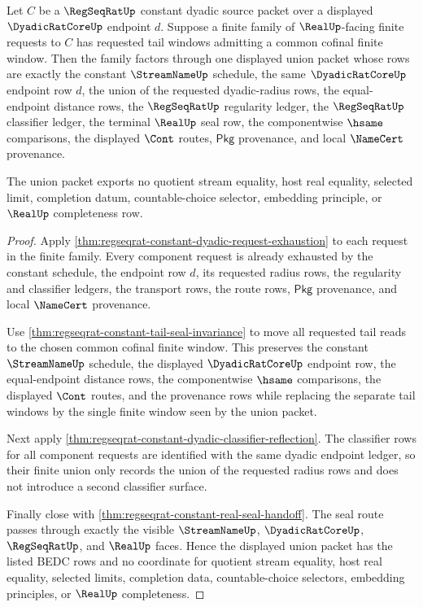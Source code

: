 \begin{theorem}
\label{thm:regseqrat-constant-dyadic-finite-request-union-seal}
Let $C$ be a $\RegSeqRatUp$ constant dyadic source packet over a displayed
$\DyadicRatCoreUp$ endpoint $d$. Suppose a finite family of
$\RealUp$-facing finite requests to $C$ has requested tail windows admitting a
common cofinal finite window. Then the family factors through one displayed
union packet whose rows are exactly the constant $\StreamNameUp$ schedule, the
same $\DyadicRatCoreUp$ endpoint row $d$, the union of the requested
dyadic-radius rows, the equal-endpoint distance rows, the
$\RegSeqRatUp$ regularity ledger, the $\RegSeqRatUp$ classifier ledger, the
terminal $\RealUp$ seal row, the componentwise $\hsame$ comparisons, the
displayed $\Cont$ routes, $\mathsf{Pkg}$ provenance, and local $\NameCert$
provenance.

The union packet exports no quotient stream equality, host real equality,
selected limit, completion datum, countable-choice selector, embedding
principle, or $\RealUp$ completeness row.
\end{theorem}
\begin{proof}
Apply \autoref{thm:regseqrat-constant-dyadic-request-exhaustion} to each
request in the finite family. Every component request is already exhausted by
the constant schedule, the endpoint row $d$, its requested radius rows, the
regularity and classifier ledgers, the transport rows, the route rows,
$\mathsf{Pkg}$ provenance, and local $\NameCert$ provenance.

Use \autoref{thm:regseqrat-constant-tail-seal-invariance} to move all
requested tail reads to the chosen common cofinal finite window. This preserves
the constant $\StreamNameUp$ schedule, the displayed $\DyadicRatCoreUp$
endpoint row, the equal-endpoint distance rows, the componentwise $\hsame$
comparisons, the displayed $\Cont$ routes, and the provenance rows while
replacing the separate tail windows by the single finite window seen by the
union packet.

Next apply \autoref{thm:regseqrat-constant-dyadic-classifier-reflection}. The
classifier rows for all component requests are identified with the same
dyadic endpoint ledger, so their finite union only records the union of the
requested radius rows and does not introduce a second classifier surface.

Finally close with
\autoref{thm:regseqrat-constant-real-seal-handoff}. The seal route passes
through exactly the visible $\StreamNameUp$, $\DyadicRatCoreUp$,
$\RegSeqRatUp$, and $\RealUp$ faces. Hence the displayed union packet has the
listed BEDC rows and no coordinate for quotient stream equality, host real
equality, selected limits, completion data, countable-choice selectors,
embedding principles, or $\RealUp$ completeness.
\end{proof}
